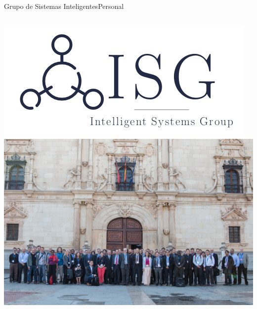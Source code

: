 \documentclass[10pt,compress]{beamer} %
\begin{document}
\begin{frame}{Grupo de Sistemas Inteligentes}{Personal}
\begin{columns}
		\includegraphics[width=\textwidth]{figs/isg-color}\\
		\smallskip
	 	\includegraphics[width=\textwidth]{figs/smcit}
    \end{columns}

    \note{    
    }
\end{frame}
\end{document}
